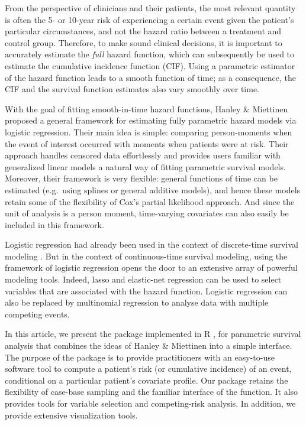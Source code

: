 From the perspective of clinicians and their patients, the most relevant
quantity is often the 5- or 10-year risk of experiencing a certain event
given the patient's particular circumstances, and not the hazard ratio
between a treatment and control group. Therefore, to make sound clinical
decisions, it is important to accurately estimate the \emph{full} hazard
function, which can subsequently be used to estimate the cumulative
incidence function (CIF). Using a parametric estimator of the hazard
function leads to a smooth function of time; as a consequence, the CIF
and the survival function estimates also vary smoothly over time.

With the goal of fitting smooth-in-time hazard functions, Hanley \&
Miettinen \citeyearpar{hanley2009fitting} proposed a general framework
for estimating fully parametric hazard models via logistic regression.
Their main idea is simple: comparing person-moments when the event of
interest occurred with moments when patients were at risk. Their
approach handles censored data effortlessly and provides users familiar
with generalized linear models a natural way of fitting parametric
survival models. Moreover, their framework is very flexible: general
functions of time can be estimated (e.g.~using splines or general
additive models), and hence these models retain some of the flexibility
of Cox's partial likelihood approach. And since the unit of analysis is
a person moment, time-varying covariates can also easily be included in
this framework.

Logistic regression had already been used in the context of
discrete-time survival modeling \citep{cox1972regression}. But in the
context of continuous-time survival modeling, using the framework of
logistic regression opens the door to an extensive array of powerful
modeling tools. Indeed, lasso and elastic-net regression can be used to
select variables that are associated with the hazard function. Logistic
regression can also be replaced by multinomial regression to analyse
data with multiple competing events.

In this article, we present the  package
\citep{casebase-package} implemented in \textsf{R} \citep{r-core}, for
parametric survival analysis that combines the ideas of Hanley \&
Miettinen \citeyearpar{hanley2009fitting} into a simple interface. The
purpose of the  package is to provide practitioners with
an easy-to-use software tool to compute a patient's risk (or cumulative
incidence) of an event, conditional on a particular patient's covariate
profile. Our package retains the flexibility of case-base sampling and
the familiar interface of the  function. It also provides
tools for variable selection and competing-risk analysis. In addition,
we provide extensive visualization tools.

